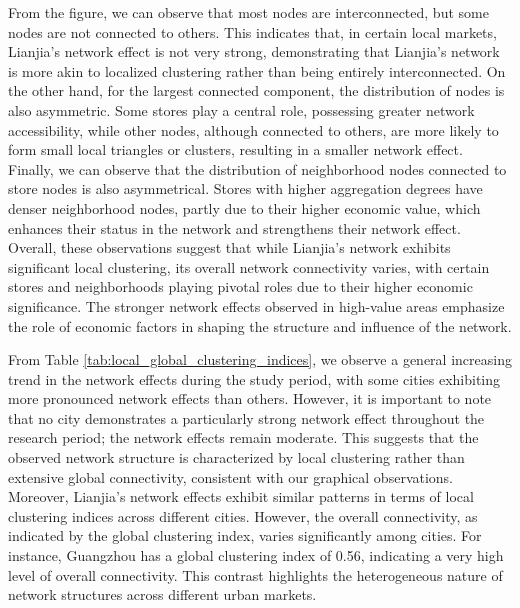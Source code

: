 \documentclass[11pt]{article}
\begin{document}

From the figure, we can observe that most nodes are interconnected, but some nodes are not connected to others. This indicates that, in certain local markets, Lianjia's network effect is not very strong, demonstrating that Lianjia's network is more akin to localized clustering rather than being entirely interconnected. On the other hand, for the largest connected component, the distribution of nodes is also asymmetric. Some stores play a central role, possessing greater network accessibility, while other nodes, although connected to others, are more likely to form small local triangles or clusters, resulting in a smaller network effect. Finally, we can observe that the distribution of neighborhood nodes connected to store nodes is also asymmetrical. Stores with higher aggregation degrees have denser neighborhood nodes, partly due to their higher economic value, which enhances their status in the network and strengthens their network effect. Overall, these observations suggest that while Lianjia's network exhibits significant local clustering, its overall network connectivity varies, with certain stores and neighborhoods playing pivotal roles due to their higher economic significance. The stronger network effects observed in high-value areas emphasize the role of economic factors in shaping the structure and influence of the network.

From Table \ref{tab:local_global_clustering_indices}, we observe a general increasing trend in the network effects during the study period, with some cities exhibiting more pronounced network effects than others. However, it is important to note that no city demonstrates a particularly strong network effect throughout the research period; the network effects remain moderate. This suggests that the observed network structure is characterized by local clustering rather than extensive global connectivity, consistent with our graphical observations. Moreover, Lianjia's network effects exhibit similar patterns in terms of local clustering indices across different cities. However, the overall connectivity, as indicated by the global clustering index, varies significantly among cities. For instance, Guangzhou has a global clustering index of 0.56, indicating a very high level of overall connectivity. This contrast highlights the heterogeneous nature of network structures across different urban markets. 
\end{document}
